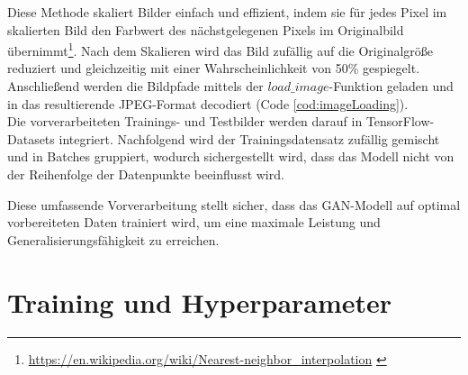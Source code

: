 Diese Methode skaliert Bilder einfach und effizient, indem sie für jedes Pixel im skalierten Bild den Farbwert des nächstgelegenen Pixels im Originalbild übernimmt\footnote{\url{https://en.wikipedia.org/wiki/Nearest-neighbor_interpolation} \label{note:nearestNeighbor}}.
Nach dem Skalieren wird das Bild zufällig auf die Originalgröße reduziert und gleichzeitig mit einer Wahrscheinlichkeit von 50\% gespiegelt.
Anschließend werden die Bildpfade mittels der $load\_image$-Funktion geladen und in das resultierende JPEG-Format decodiert (Code \ref{cod:imageLoading}).
\\\newline
Die vorverarbeiteten Trainings- und Testbilder werden darauf in TensorFlow-Datasets integriert. Nachfolgend wird der Trainingsdatensatz zufällig gemischt und in Batches gruppiert, wodurch sichergestellt wird, dass das Modell nicht von der Reihenfolge der Datenpunkte beeinflusst wird.


Diese umfassende Vorverarbeitung stellt sicher, dass das GAN-Modell auf optimal vorbereiteten Daten trainiert wird, um eine maximale Leistung und Generalisierungsfähigkeit zu erreichen.




\newpage
\section{Training und Hyperparameter}

